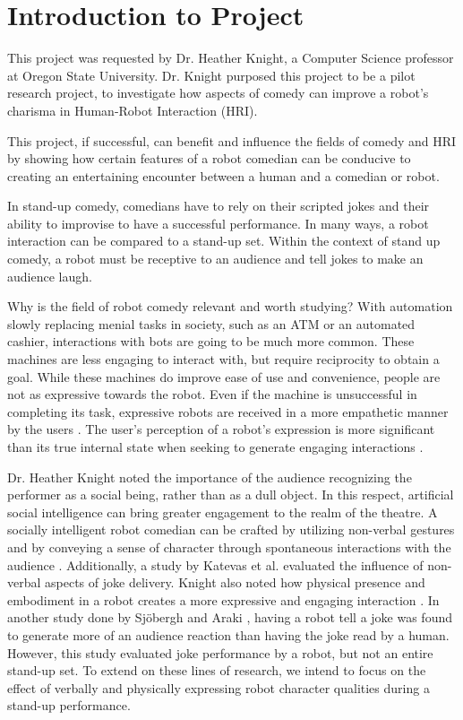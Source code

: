 
\section{Introduction to Project}
This project was requested by Dr. Heather Knight, a Computer Science professor at Oregon State University.
Dr. Knight purposed this project to be a pilot research project, to investigate how aspects of comedy can improve a robot's charisma in Human-Robot Interaction (HRI).


This project, if successful, can benefit and influence the fields of comedy and HRI by showing how certain features of a robot comedian can be conducive to creating an entertaining encounter between a human and a comedian or robot.

In stand-up comedy, comedians have to rely on their scripted jokes and their ability to improvise to have a successful performance. In many ways, a robot interaction can be compared to a stand-up set. Within the context of stand up comedy, a robot must be receptive to an audience and tell jokes to make an audience laugh.

Why is the field of robot comedy relevant and worth studying? With automation slowly replacing menial tasks in society, such as an ATM or an automated cashier, interactions with bots are going to be much more common. These machines are less engaging to interact with, but require reciprocity to obtain a goal. While these machines do improve ease of use and convenience, people are not as expressive towards the robot. Even if the machine is unsuccessful in completing its task, expressive robots are received in a more empathetic manner by the users {\cite{DesignExBeh:2017}}. The user’s perception of a robot’s expression is more significant than its true internal state when seeking to generate engaging interactions {\cite{KnightEightLessons:2011}}.

Dr. Heather Knight noted the importance of the audience recognizing the performer as a social being, rather than as a dull object. In this respect, artificial social intelligence can bring greater engagement to the realm of the theatre. A socially intelligent robot comedian can be crafted by utilizing non-verbal gestures and by conveying a sense of character through spontaneous interactions with the audience {\cite{KnightEightLessons:2011}}.  Additionally, a study by Katevas et al. {\cite{RobotComedyLab:2015}} evaluated the influence of non-verbal aspects of joke delivery. Knight also noted how physical presence and embodiment in a robot creates a more expressive and engaging interaction {\cite{KnightEightLessons:2011}}. In another study done by Sjöbergh and Araki {\cite{RobotsMakeThings:2008}}, having a robot tell a joke was found to generate more of an audience reaction than having the joke read by a human. However, this study evaluated joke performance by a robot, but not an entire stand-up set. To extend on these lines of research, we intend to focus on the effect of verbally and physically expressing robot character qualities during a stand-up performance.

